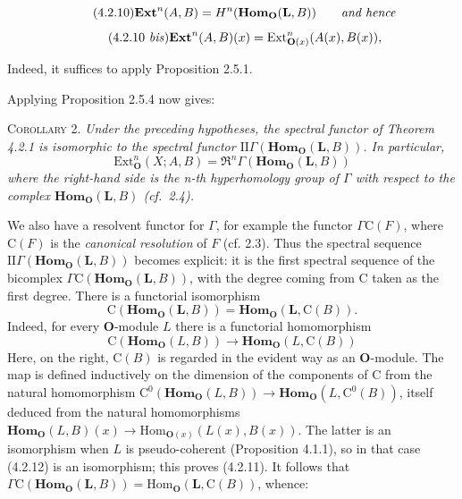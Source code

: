 \clearpage
{}

\[
\tag{4.2.10}
\mathbf{Ext}^n(A,B)=H^n(\mathbf{Hom}_{\mathbf O}(\mathbf{L},B))\qquad\text{\textit{and hence}}
\]
\[
\tag{4.2.10 \textit{bis}}
\mathbf{Ext}^n(A,B)(x)=
\mathrm{Ext}_{{\mathbf O}(x)}^n(A(x),B(x)),
\]

Indeed, it suffices to apply Proposition 2.5.1.

Applying Proposition 2.5.4 now gives:

\textsc{Corollary 2.} \textit{Under the preceding hypotheses, the
spectral functor of Theorem \textup{4.2.1} is isomorphic to the spectral functor
$\mathrm{II}\Gamma(\mathbf{Hom}_{\mathbf O}(\mathbf{L},B))$. In particular,}
\[
\mathrm{Ext}_{\mathbf O}^n(X;A,B)=
\mathfrak{R}^n\Gamma(\mathbf{Hom}_{\mathbf O}(\mathbf{L},B))
\]
\textit{where the right-hand side is the n-th hyperhomology group of
$\Gamma$ with respect to the complex $\mathbf{Hom}_{\mathbf O}(\mathbf{L},B)$
\textup{(}cf.\ \textup{2.4)}.}

We also have a resolvent functor for $\Gamma$, for example the functor
$\Gamma {\mathrm C}(F)$, where ${\mathrm C}(F)$ is the \textit{canonical resolution} of $F$ (cf. 2.3).
Thus the spectral sequence $\mathrm{II}\Gamma(\mathbf{Hom}_{\mathbf O}(\mathbf{L},B))$ becomes
explicit: it is the first spectral sequence of the bicomplex
$\Gamma {\mathrm C}(\mathbf{Hom}_{\mathbf O}(\mathbf{L},B))$, with the degree coming from ${\mathrm C}$
taken as the first degree. There is a functorial isomorphism
\[
\tag{4.2.11}
{\mathrm C}(\mathbf{Hom}_{\mathbf O}(\mathbf{L},B))=
\mathbf{Hom}_{\mathbf O}(\mathbf{L},{\mathrm C}(B)).
\]
Indeed, for every ${\mathbf O}$-module $L$ there is a functorial homomorphism
\[
\tag{4.2.12}
{\mathrm C}(\mathbf{Hom}_{\mathbf O}(L,B))\to\mathbf{Hom}_{\mathbf O}(L,{\mathrm C}(B))
\]
Here, on the right, ${\mathrm C}(B)$ is regarded in the evident way as an ${\mathbf O}$-module.
The map is defined inductively on the dimension of the components of ${\mathrm C}$ from
the natural homomorphism
${\mathrm C}^0(\mathbf{Hom}_{\mathbf O}(L,B))\to\mathbf{Hom}_{\mathbf O}(L,{\mathrm C}^0(B))$, itself
deduced from the natural homomorphisms
$\mathbf{Hom}_{\mathbf O}(L,B)(x)\to
\mathrm{Hom}_{{\mathbf O}(x)}(L(x),B(x))$. The latter is an isomorphism when $L$ is
pseudo-coherent (Proposition 4.1.1), so in that case (4.2.12) is an
isomorphism; this proves (4.2.11). It follows that
$\Gamma {\mathrm C}(\mathbf{Hom}_{\mathbf O}(\mathbf{L},B))=
\mathrm{Hom}_{\mathbf O}(\mathbf{L},{\mathrm C}(B))$, whence:

